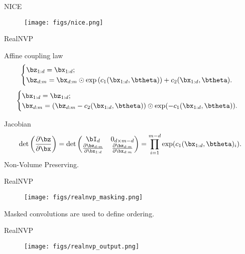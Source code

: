 \begin{frame}{NICE}
	\begin{figure}
		\centering
		\texttt{[image: figs/nice.png]}
	\end{figure}
\end{frame}
\begin{frame}{RealNVP}
	\begin{block}{Affine coupling law}
		\[
		\begin{cases} \bz_{1:d} = \bx_{1:d}; \\ \bz_{d:m} = \bx_{d:m} \odot \exp \left(c_1(\bx_{1:d}, \btheta)\right) + c_2(\bx_{1:d}, \btheta).\end{cases} 
		\]
		\[
		\begin{cases} \bx_{1:d} = \bz_{1:d}; \\ \bx_{d:m} = \left(\bz_{d:m} - c_2(\bx_{1:d}, \btheta) \right) \odot \exp(-c_1(\bx_{1:d}, \btheta)).\end{cases}
		\]
	\end{block}
	\begin{block}{Jacobian}
		\vspace{-0.3cm}
		\[
		\det \left( \frac{\partial \bz}{\partial \bx} \right) = \det 
		\begin{pmatrix}
			\bI_d & 0_{d \times m - d} \\
			\frac{\partial \bz_{d:m}}{\partial \bx_{1:d}} & \frac{\partial \bz_{d:m}}{\partial \bx_{d:m}}
		\end{pmatrix} = \prod_{i=1}^{m - d} \exp (c_1(\bx_{1:d}, \btheta)_i).
		\]
		Non-Volume Preserving.
	\end{block}
	
\end{frame}
\begin{frame}{RealNVP}
	\begin{figure}
		\centering
		\texttt{[image: figs/realnvp\_masking.png]}
	\end{figure}
	Masked convolutions are used to define ordering.
	
\end{frame}
\begin{frame}{RealNVP}
	\begin{figure}
		\centering
		\texttt{[image: figs/realnvp\_output.png]}
	\end{figure}
\end{frame}
